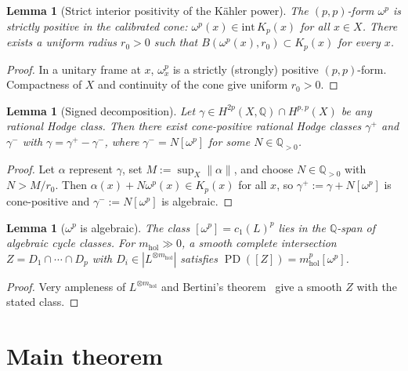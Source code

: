 \documentclass[11pt]{article}
\numberwithin{equation}{section}
\theoremstyle{plain}
\newtheorem{lemma}[theorem]{Lemma}
\theoremstyle{definition}
\theoremstyle{remark}
\DeclareMathOperator{\PD}{PD}
\newcommand{\Q}{\mathbb{Q}}
\newcommand{\mhol}{m_{\mathrm{hol}}}
\begin{document}
\begin{lemma}[Strict interior positivity of the K\"ahler power]
\label{lem:kahler-positive}
The $(p,p)$-form $\omega^p$ is strictly positive in the calibrated cone:
$\omega^p(x)\in\mathrm{int}\,K_p(x)$ for all $x\in X$.
There exists a uniform radius $r_0>0$ such that
$B(\omega^p(x),r_0)\subset K_p(x)$ for every $x$.
\end{lemma}

\begin{proof}
In a unitary frame at $x$, $\omega^p_x$ is a strictly (strongly) positive
$(p,p)$-form.
Compactness of $X$ and continuity of the cone give uniform $r_0>0$.
\end{proof}

\begin{lemma}[Signed decomposition]\label{lem:signed-decomp}
Let $\gamma\in H^{2p}(X,\Q)\cap H^{p,p}(X)$ be any rational Hodge class.
Then there exist cone-positive rational Hodge classes $\gamma^+$ and
$\gamma^-$ with $\gamma=\gamma^+-\gamma^-$, where
$\gamma^-=N[\omega^p]$ for some $N\in\Q_{>0}$.
\end{lemma}

\begin{proof}
Let $\alpha$ represent $\gamma$, set $M:=\sup_X\|\alpha\|$, and choose
$N\in\Q_{>0}$ with $N>M/r_0$.
Then $\alpha(x)+N\omega^p(x)\in K_p(x)$ for all $x$, so
$\gamma^+:=\gamma+N[\omega^p]$ is cone-positive and
$\gamma^-:=N[\omega^p]$ is algebraic.
\end{proof}

\begin{lemma}[$\omega^p$ is algebraic]\label{lem:gamma-minus-alg}
The class $[\omega^p]=c_1(L)^p$ lies in the $\Q$-span of algebraic
cycle classes.  For $\mhol\gg 0$, a smooth complete intersection
$Z=D_1\cap\cdots\cap D_p$ with $D_i\in|L^{\otimes\mhol}|$ satisfies
$\PD([Z])=\mhol^p[\omega^p]$.
\end{lemma}

\begin{proof}
Very ampleness of $L^{\otimes\mhol}$ and Bertini's
theorem~\cite{Hartshorne77} give a smooth $Z$ with the stated class.
\end{proof}


\section{Main theorem}\label{sec:main}
\end{document}
